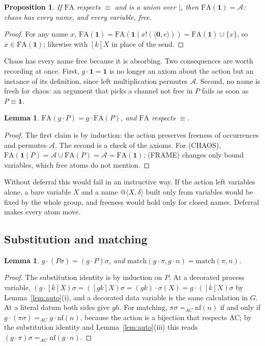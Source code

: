 \documentclass[11pt]{article}
\makeatletter
\newtheorem{lemma}[theorem]{Lemma}
\newtheorem{proposition}[theorem]{Proposition}
\theoremstyle{definition}
\theoremstyle{remark}
\newcommand{\nil}{\mathbf{0}}
\newcommand{\chaos}{\mathbf{1}}
\newcommand{\out}[3]{#1!(\langle #2, #3\rangle)}
\newcommand{\qn}[2]{@\langle #1, #2\rangle}
\newcommand{\act}[2]{#1\cdot #2}
\newcommand{\scong}{\equiv}
\newcommand{\match}{\mathrm{match}}
\newcommand{\nf}{\mathrm{nf}}
\newcommand{\fr}[2]{[#1]#2}
\newcommand{\FA}{\mathrm{FA}}
\newcommand{\Atoms}{\mathcal{A}}
\makeatother
\begin{document}
\begin{proposition}\label{prop:chaosnames}
If $\FA$ respects $\scong$ and is a union over $\mid$, then
$\FA(\chaos)=\Atoms$: chaos has every name, and every variable, free.
\end{proposition}

\begin{proof}
For any name $x$, $\FA(\chaos)=\FA(\chaos\mid\out{x}{\nil}{e})
=\FA(\chaos)\cup\{x\}$, so $x\in\FA(\chaos)$; likewise with $\fr{k}{X}$ in
place of the send.
\end{proof}

Chaos has every name free because it is absorbing. Two consequences are worth
recording at once. First, $\act{g}{\chaos}=\chaos$ is no longer an axiom about
the action but an instance of its definition, since left multiplication
permutes $\Atoms$. Second, no name is fresh for chaos: an argument that picks
a channel not free in $P$ fails as soon as $P\scong\chaos$.

\begin{lemma}\label{lem:fnaction}
$\FA(\act{g}{P})=\act{g}{\FA(P)}$, and $\FA$ respects $\scong$.
\end{lemma}

\begin{proof}
The first claim is by induction: the action preserves freeness of
occurrences and permutes $\Atoms$. The second is a check of the axioms. For
(CHAOS), $\FA(\chaos\mid P)=\Atoms\cup\FA(P)=\Atoms=\FA(\chaos)$; (FRAME)
changes only bound variables, which free atoms do not mention.
\end{proof}

Without deferral this would fail in an instructive way. If the action left
variables alone, a bare variable $X$ and a name $\qn{X}{\delta}$ built only
from variables would be fixed by the whole group, and freeness would hold only
for closed names. Deferral makes every atom move.

\subsection{Substitution and matching}

\begin{lemma}\label{lem:subst}
$\act{g}{(P\sigma)}=(\act{g}{P})\sigma$, and
$\match(\act{g}{\pi},\act{g}{n})=\match(\pi,n)$.
\end{lemma}

\begin{proof}
The substitution identity is by induction on $P$. At a decorated process
variable,
$(\act{g}{\fr{k}{X}})\sigma=(\fr{gk}{X})\sigma=\act{(gk)}{\sigma(X)}
=\act{g}{(\fr{k}{X})\sigma}$ by Lemma~\ref{lem:auto}(i), and a decorated data
variable is the same calculation in $G$. At a literal datum both sides give
$gh$. For matching, $\pi\sigma=_{AC}\nf(n)$ if and only if
$\act{g}{(\pi\sigma)}=_{AC}\act{g}{\nf(n)}$, because the action is a bijection
that respects AC; by the substitution identity and
Lemma~\ref{lem:auto}(iii) this reads
$(\act{g}{\pi})\sigma=_{AC}\nf(\act{g}{n})$.
\end{proof}
\end{document}
